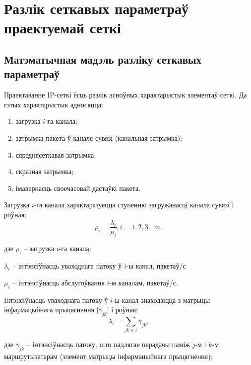 \section{Разлік сеткавых параметраў праектуемай сеткі}

\subsection{Матэматычная мадэль разліку сеткавых параметраў}

Праектаванне IP-сеткі ёсць разлік асноўных характарыстык элементаў сеткі.
Да гэтых характарыстык адносяцца:
\begin{enumerate}
    \item загрузка $i$-га канала;
    \item затрымка пакета ў канале сувязі (канальная затрымка);
    \item сярэднясеткавая затрымка;
    \item скразная затрымка;
    \item імавернасць своечасовай дастаўкі пакета.
\end{enumerate}

Загрузка $i$-га канала характаразуецца ступенню загружанасці
канала сувязі і роўная:
\begin{equation}
    \rho_i = \frac{\lambda_i}{\mu_i}, i = 1,2,3 \ldots m,
\end{equation}
\begin{Explanation}
    \item[дзе] $\rho_i$ -- загрузка $i$-га канала;
    \item $\lambda_i$ -- інтэнсіўнасць уваходнага патоку ў
                         $i$-ы канал, пакетаў/с
    \item $\mu_i$ -- інтэнсіўнасць абслугоўвання $i$-м
                     каналам, пакетаў/с.
\end{Explanation}

Інтэнсіўнасць уваходнага патоку ў $i$-ы канал знаходзіцца з
матрыцы інфармацыйнага прыцягнення [$\gamma_{jk}$] і роўная:
\begin{equation}
    \lambda_i = \sum_{jk \in i} \gamma_{jk},
\end{equation}
\begin{Explanation}
    \item[дзе] $\gamma_{jk}$ -- інтэнсіўнасць патоку, што
               падлягае перадачы паміж $j$-м і $k$-м маршрутызатарам
               (элемент матрыцы інфармацыйнага прыцягнення);
\end{Explanation}

